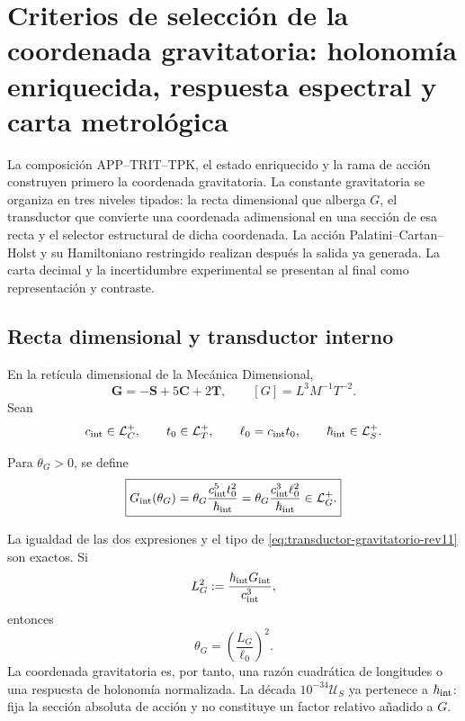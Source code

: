 \section[Criterios estructurales y carta metrológica de \(G\)]{Criterios de
selección de la coordenada gravitatoria: holonomía enriquecida, respuesta
espectral y carta metrológica}
\label{sec:selector-gravitatorio-rev11}

La composición APP--TRIT--TPK, el estado enriquecido y la rama de acción
construyen primero la coordenada gravitatoria. La constante gravitatoria se
organiza en tres niveles tipados: la recta dimensional que alberga \(G\), el
transductor que convierte una coordenada adimensional en una sección de esa
recta y el selector estructural de dicha coordenada. La acción
Palatini--Cartan--Holst y su Hamiltoniano restringido realizan después la
salida ya generada. La carta decimal y la incertidumbre experimental se
presentan al final como representación y contraste.

\subsection{Recta dimensional y transductor interno}

En la retícula dimensional de la Mecánica Dimensional,
\[
 \mathbf G=-\mathbf S+5\mathbf C+2\mathbf T,
 \qquad [G]=L^3M^{-1}T^{-2}.
\]
Sean
\[
 c_{\rm int}\in\mathcal L_C^+,
 \qquad t_0\in\mathcal L_T^+,
 \qquad \ell_0=c_{\rm int}t_0,
 \qquad \hbar_{\rm int}\in\mathcal L_S^+.
\]

\begin{definition}
\label{def:transductor-gravitatorio-rev11}
Para \(\theta_G>0\), se define
\begin{equation}
 \boxed{
 G_{\rm int}(\theta_G)
 =\theta_G\frac{c_{\rm int}^{5}t_0^2}{\hbar_{\rm int}}
 =\theta_G\frac{c_{\rm int}^{3}\ell_0^2}{\hbar_{\rm int}}
 \in\mathcal L_G^+.}
 \label{eq:transductor-gravitatorio-rev11}
\end{equation}
\end{definition}

La igualdad de las dos expresiones y el tipo de
\eqref{eq:transductor-gravitatorio-rev11} son exactos. Si
\[
 L_G^2:=\frac{\hbar_{\rm int}G_{\rm int}}{c_{\rm int}^3},
\]
entonces
\begin{equation}
 \theta_G=\left(\frac{L_G}{\ell_0}\right)^2.
 \label{eq:thetaG-razon-longitudes-rev11}
\end{equation}
La coordenada gravitatoria es, por tanto, una razón cuadrática de longitudes
o una respuesta de holonomía normalizada. La década
\(10^{-34}\mathcal U_S\) ya pertenece a \(\hbar_{\rm int}\): fija la sección
absoluta de acción y no constituye un factor relativo añadido a \(G\).


